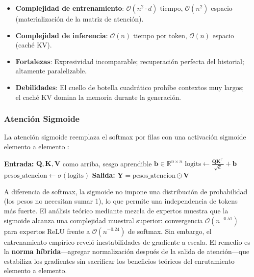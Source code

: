 \begin{itemize}[leftmargin=*]
    \item \textbf{Complejidad de entrenamiento}: $\mathcal{O}(n^2 \cdot d)$ tiempo, $\mathcal{O}(n^2)$ espacio (materialización de la matriz de atención).
    \item \textbf{Complejidad de inferencia}: $\mathcal{O}(n)$ tiempo por token, $\mathcal{O}(n)$ espacio (caché KV).
    \item \textbf{Fortalezas}: Expresividad incomparable; recuperación perfecta del historial; altamente paralelizable.
    \item \textbf{Debilidades}: El cuello de botella cuadrático prohíbe contextos muy largos; el caché KV domina la memoria durante la generación.
\end{itemize}

\subsubsection{Atención Sigmoide}
La atención sigmoide reemplaza el softmax por filas con una activación sigmoide elemento a elemento \citep{ramapuram_theory_2024}:

\begin{algorithmic}[1]
\State \textbf{Entrada:} $\mathbf{Q}, \mathbf{K}, \mathbf{V}$ como arriba, sesgo aprendible $\mathbf{b} \in \mathbb{R}^{n \times n}$
\State $\text{logits} \gets \frac{\mathbf{Q}\mathbf{K}^\top}{\sqrt{d}} + \mathbf{b}$
\State $\text{pesos\_atencion} \gets \sigma(\text{logits})$ 
\State \textbf{Salida:} $\mathbf{Y} = \text{pesos\_atencion} \odot \mathbf{V}$
\end{algorithmic}

A diferencia de softmax, la sigmoide no impone una distribución de probabilidad (los pesos no necesitan sumar 1), lo que permite una independencia de tokens más fuerte. El análisis teórico mediante mezcla de expertos muestra que la sigmoide alcanza una complejidad muestral superior: convergencia $\mathcal{O}(n^{-0.51})$ para expertos ReLU frente a $\mathcal{O}(n^{-0.24})$ de softmax. Sin embargo, el entrenamiento empírico reveló inestabilidades de gradiente a escala. El remedio es la \textbf{norma híbrida}---agregar normalización después de la salida de atención---que estabiliza los gradientes sin sacrificar los beneficios teóricos del enrutamiento elemento a elemento.

